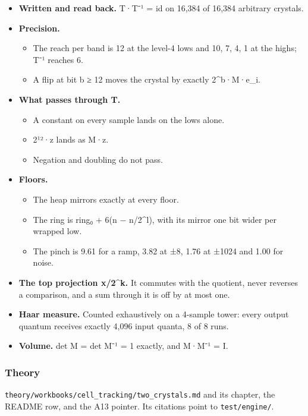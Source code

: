 \begin{itemize}
\item \textbf{Written and read back.} T·T⁻¹ = id on 16,384 of 16,384 arbitrary crystals.
\item \textbf{Precision.}

\begin{itemize}
\item The reach per band is 12 at the level-4 lows and 10, 7, 4, 1 at the highs; T⁻¹ reaches 6.
\item A flip at bit b ≥ 12 moves the crystal by exactly 2\textasciicircum{}b·M·e\_\allowbreak{}i.
\end{itemize}
\item \textbf{What passes through T.}

\begin{itemize}
\item A constant on every sample lands on the lows alone.
\item 2¹²·z lands as M·z.
\item Negation and doubling do not pass.
\end{itemize}
\item \textbf{Floors.}

\begin{itemize}
\item The heap mirrors exactly at every floor.
\item The ring is ring₀ + 6(n − n/2\textasciicircum{}l), with its mirror one bit wider per wrapped low.
\item The pinch is 9.61 for a ramp, 3.82 at ±8, 1.76 at ±1024 and 1.00 for noise.
\end{itemize}
\item \textbf{The top projection x/2\textasciicircum{}k.} It commutes with the quotient, never reverses a comparison, and a sum through it is off by at most one.
\item \textbf{Haar measure.} Counted exhaustively on a 4-sample tower: every output quantum receives exactly 4,096 input quanta, 8 of 8 runs.
\item \textbf{Volume.} det M = det M⁻¹ = 1 exactly, and M·M⁻¹ = I.
\end{itemize}

\subsubsection{\texorpdfstring{Theory}{Theory}}

\texttt{theory/\allowbreak{}workbooks/\allowbreak{}cell\_\allowbreak{}tracking/\allowbreak{}two\_\allowbreak{}crystals.\allowbreak{}md} and its chapter, the README row, and the A13 pointer. Its citations point to \texttt{test/\allowbreak{}engine/\allowbreak{}}.

